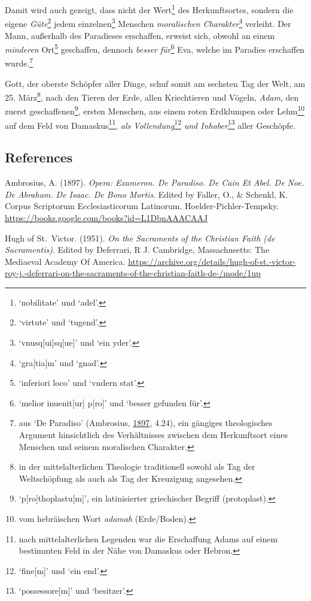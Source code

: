 \documentclass[
]{article}
\begin{document}
Damit wird auch gezeigt, dass nicht der Wert\footnote{`nobilitate' und
  `adel'.} des Herkunftsortes, sondern die eigene \emph{Güte}\footnote{`virtute'
  und `tugend'.} jedem einzelnen\footnote{`vnusq{[}ui{]}sq{[}ue{]}' und
  `ein yder'.} Menschen \emph{moralischen Charakter}\footnote{`gra{[}tia{]}m'
  und `gnad'.} verleiht. Der Mann, außerhalb des Paradieses erschaffen,
erweist sich, obwohl an einem \emph{minderen} Ort\footnote{`inferiori
  loco' und `vndern stat'.} geschaffen, dennoch \emph{besser
für}\footnote{`melior inuenit{[}ur{]} p{[}ro{]}' und `besser gefunden
  für'.} Eva, welche im Paradies erschaffen wurde.\footnote{aus `De
  Paradiso' (Ambrosius,
  \href{https://books.google.com/books?id=L1DbnAAACAAJ}{1897}, 4.24),
  ein gängiges theologisches Argument hinsichtlich des Verhältnisses
  zwischen dem Herkunftsort eines Menschen und seinem moralischen
  Charakter.}

Gott, der oberste Schöpfer aller Dinge, schuf somit am sechsten Tag der
Welt, am 25. März\footnote{in der mittelalterlichen Theologie
  traditionell sowohl als Tag der Weltschöpfung als auch als Tag der
  Kreuzigung angesehen.}, nach den Tieren der Erde, allen Kriechtieren
und Vögeln, \emph{Adam}, den zuerst geschaffenen\footnote{`p{[}ro{]}thoplastu{[}m{]}',
  ein latinisierter griechischer Begriff (protoplast).}, ersten
Menschen, aus einem roten Erdklumpen oder Lehm\footnote{vom hebräischen
  Wort \emph{adamah} (Erde/Boden).} auf dem Feld von
Damaskus\footnote{nach mittelalterlichen Legenden war die Erschaffung
  Adams auf einem bestimmten Feld in der Nähe von Damaskus oder Hebron.},
\emph{als Vollendung}\footnote{`fine{[}m{]}' und `ein end'.} \emph{und
Inhaber}\footnote{`possessore{[}m{]}' und `besitzer'.} aller Geschöpfe.

\hypertarget{references}{%
\subsection{References}\label{references}}

Ambrosius, A. (1897). \emph{Opera: Exameron. De Paradiso. De Cain Et
Abel. De Noe. De Abraham. De Isaac. De Bono Mortis}. Edited by Faller,
O., \& Schenkl, K. Corpus Scriptorum Ecclesiasticorum Latinorum.
Hoelder-Pichler-Tempsky.
\url{https://books.google.com/books?id=L1DbnAAACAAJ}

Hugh of St.~Victor. (1951). \emph{On the Sacraments of the Christian
Faith (de Sacramentis)}. Edited by Deferrari, R J. Cambridge,
Massachusetts: The Mediaeval Academy Of America.
\url{https://archive.org/details/hugh-of-st.-victor-roy-j.-deferrari-on-the-sacraments-of-the-christian-faith-de-/mode/1up}
\end{document}
